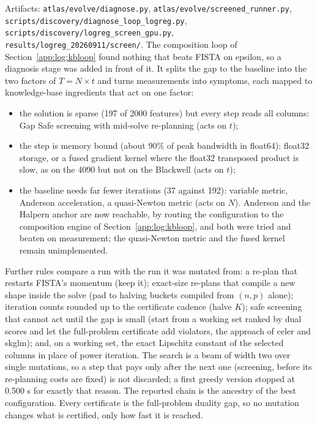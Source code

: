 Artifacts: \texttt{atlas/evolve/diagnose.py}, \texttt{atlas/evolve/screened\_runner.py},
\texttt{scripts/discovery/diagnose\_loop\_logreg.py},
\texttt{scripts/discovery/logreg\_screen\_gpu.py}, \texttt{results/logreg\_20260911/screen/}.
The composition loop of Section~\ref{app:log:kbloop} found nothing that beats
FISTA on epsilon, so a diagnosis stage was added in front of it. It splits the
gap to the baseline into the two factors of $T = N \times t$ and turns
measurements into symptoms, each mapped to knowledge-base ingredients that act
on one factor:
\begin{itemize}
\item the solution is sparse (197 of 2000 features) but every step reads all
  columns: Gap Safe screening with mid-solve re-planning (acts on $t$);
\item the step is memory bound (about 90\% of peak bandwidth in float64):
  float32 storage, or a fused gradient kernel where the float32 transposed
  product is slow, as on the 4090 but not on the Blackwell (acts on $t$);
\item the baseline needs far fewer iterations (37 against 192): variable
  metric, Anderson acceleration, a quasi-Newton metric (acts on $N$). Anderson
  and the Halpern anchor are now reachable, by routing the configuration to the
  composition engine of Section~\ref{app:log:kbloop}, and both were tried and
  beaten on measurement; the quasi-Newton metric and the fused kernel remain
  unimplemented.
\end{itemize}
Further rules compare a run with the run it was mutated from: a re-plan that
restarts FISTA's momentum (keep it); exact-size re-plans that compile a new
shape inside the solve (pad to halving buckets compiled from $(n, p)$ alone);
iteration counts rounded up to the certificate cadence (halve $K$); safe
screening that cannot act until the gap is small (start from a working set
ranked by dual scores and let the full-problem certificate add violators, the
approach of celer and skglm); and, on a working set, the exact Lipschitz
constant of the selected columns in place of power iteration. The search is a
beam of width two over single mutations, so a step that pays only after the
next one (screening, before its re-planning costs are fixed) is not discarded;
a first greedy version stopped at 0.500 s for exactly that reason. The
reported chain is the ancestry of the best configuration. Every certificate is
the full-problem duality gap, so no mutation changes what is certified, only how
fast it is reached.

